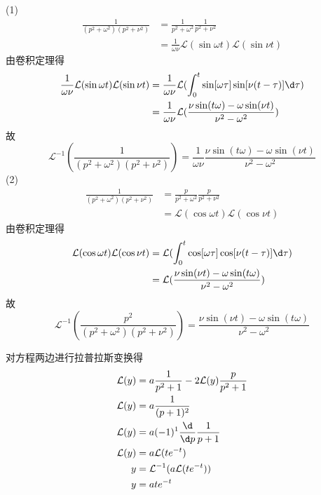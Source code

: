 \documentclass{phyasgn}
\renewcommand{\L}{\mathcal{L}}
\begin{document}
\begin{sol}[5]
    (1)\begin{align*}
        \frac{1}{(p^2+\omega^2)(p^2+\nu^2)}&=\frac{1}{p^2+\omega^2}\frac{1}{p^2+\nu^2}\\
        &=\frac{1}{\omega\nu}\L(\sin\omega t)\L(\sin\nu t)
    \end{align*}
    由卷积定理得
    \begin{align*}
        \frac{1}{\omega\nu}\L(\sin\omega t)\L(\sin\nu t)&=\frac{1}{\omega\nu}\L(\int_{0}^{t}\sin[\omega\tau]\sin[\nu(t-\tau)]\d\tau)\\
        &=\frac{1}{\omega\nu}\L(\frac{\nu  \sin (t \omega )-\omega  \sin (\nu  t)}{\nu ^2-\omega ^2})
    \end{align*}
    故$$\L^{-1}(\frac{1}{(p^2+\omega^2)(p^2+\nu^2)})=\frac{1}{\omega\nu}\frac{\nu  \sin (t \omega )-\omega  \sin (\nu  t)}{\nu ^2-\omega ^2}$$
    (2)\begin{align*}
        \frac{1}{(p^2+\omega^2)(p^2+\nu^2)}&=\frac{p}{p^2+\omega^2}\frac{p}{p^2+\nu^2}\\
        &=\L(\cos\omega t)\L(\cos\nu t)
    \end{align*}
    由卷积定理得
    \begin{align*}
        \L(\cos\omega t)\L(\cos\nu t)&=\L(\int_{0}^{t}\cos[\omega\tau]\cos[\nu(t-\tau)]\d\tau)\\
        &=\L(\frac{\nu  \sin (\nu  t)-\omega  \sin (t \omega )}{\nu ^2-\omega ^2})
    \end{align*}
    故$$\L^{-1}(\frac{p^2}{(p^2+\omega^2)(p^2+\nu^2)})=\frac{\nu  \sin (\nu  t)-\omega  \sin (t \omega )}{\nu ^2-\omega ^2}$$
\end{sol}\par

\begin{sol}[5]
    对方程两边进行拉普拉斯变换得
    \begin{align*}
        \L(y)&=a\frac{1}{p^2+1}-2\L(y)\frac{p}{p^2+1}\\
        \L(y)&=a\frac{1}{(p+1)^2}\\
        \L(y)&=a(-1)^1\frac{\d}{\d p}\frac{1}{p+1}\\
        \L(y)&=a\L(te^{-t})\\
        y&=\L^{-1}(a\L(te^{-t}))\\
        y&=ate^{-t}
    \end{align*}
\end{sol}\par
\end{document}
